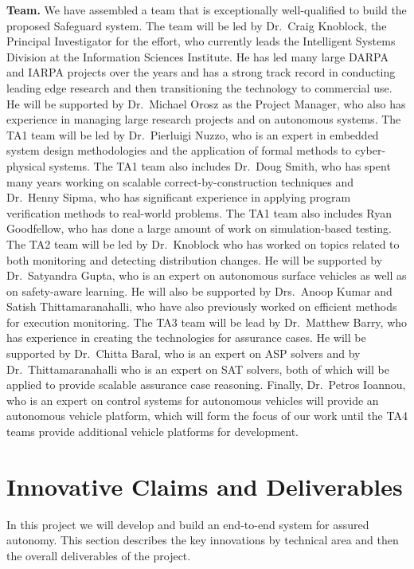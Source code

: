 \documentclass[12pt]{dod-blank}
\begin{document}
\textbf{Team.} We have assembled a team that is exceptionally well-qualified to build the proposed Safeguard system.  The team will be led by Dr.\ Craig Knoblock, the Principal Investigator for the effort, who currently leads the Intelligent Systems Division at the Information Sciences Institute.  He has led many large DARPA and IARPA projects over the years and has a strong track record in conducting leading edge research and then transitioning the technology to commercial use.  He will be supported by Dr.\ Michael Orosz as the Project Manager, who also has  experience in managing large research projects and on autonomous systems.  The TA1 team will be led by Dr.\ Pierluigi Nuzzo, who is an expert in embedded system design methodologies and the  application of formal methods to cyber-physical systems.  The TA1 team also includes Dr.\ Doug Smith, who has spent many years working on scalable correct-by-construction techniques and Dr.\ Henny Sipma, who has significant experience in applying program verification methods to real-world problems.  The TA1 team also includes Ryan Goodfellow, who has done a large amount of work on simulation-based testing.  The TA2 team will be led by Dr.\ Knoblock who has worked on topics related to both monitoring and detecting distribution changes.  He will be supported by Dr.\ Satyandra Gupta, who is an expert on autonomous surface vehicles as well as on safety-aware learning. He will also be supported by Drs.\ Anoop Kumar and Satish Thittamaranahalli, who have also previously worked on efficient methods for execution monitoring.  The TA3 team will be lead by Dr.\ Matthew Barry, who has experience in creating the technologies for assurance cases.  He will be supported by Dr.\ Chitta Baral, who is an expert on ASP solvers and by Dr.\ Thittamaranahalli who is an expert on SAT solvers, both of which will be applied to provide scalable assurance case reasoning.  Finally, Dr.\ Petros Ioannou, who is an expert on control systems for autonomous vehicles will provide an autonomous vehicle platform, which will form the focus of our work until the TA4 teams provide additional vehicle platforms for development.  

\newpage
\section{Innovative Claims and Deliverables}

In this project we will develop and build an end-to-end system for assured autonomy.  This section describes the key innovations by technical area and then the overall deliverables of the project.
\end{document}
